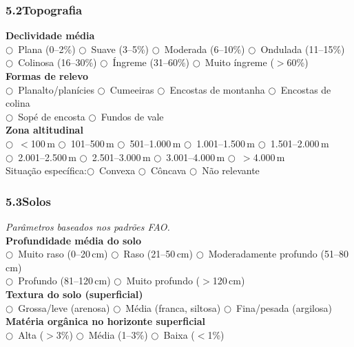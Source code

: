 \subsubsection*{5.2\quad Topografia}

\noindent\textbf{Declividade média}\\
$\bigcirc$~Plana (0--2\%) \quad $\bigcirc$~Suave (3--5\%) \quad $\bigcirc$~Moderada (6--10\%) \quad $\bigcirc$~Ondulada (11--15\%)\\
$\bigcirc$~Colinosa (16--30\%) \quad $\bigcirc$~Íngreme (31--60\%) \quad $\bigcirc$~Muito íngreme ($>$60\%)\\[4pt]
\textbf{Formas de relevo}\\
$\bigcirc$~Planalto/planícies \quad $\bigcirc$~Cumeeiras \quad $\bigcirc$~Encostas de montanha \quad $\bigcirc$~Encostas de colina\\
$\bigcirc$~Sopé de encosta \quad $\bigcirc$~Fundos de vale\\[4pt]
\textbf{Zona altitudinal}\\
$\bigcirc$~$<$100\,m \quad $\bigcirc$~101--500\,m \quad $\bigcirc$~501--1.000\,m \quad $\bigcirc$~1.001--1.500\,m \quad $\bigcirc$~1.501--2.000\,m\\
$\bigcirc$~2.001--2.500\,m \quad $\bigcirc$~2.501--3.000\,m \quad $\bigcirc$~3.001--4.000\,m \quad $\bigcirc$~$>$4.000\,m\\[4pt]
Situação específica:\quad $\bigcirc$~Convexa \quad $\bigcirc$~Côncava \quad $\bigcirc$~Não relevante

\subsubsection*{5.3\quad Solos}
\textit{Parâmetros baseados nos padrões FAO.}\\[4pt]
\textbf{Profundidade média do solo}\\
$\bigcirc$~Muito raso (0--20\,cm) \quad $\bigcirc$~Raso (21--50\,cm) \quad $\bigcirc$~Moderadamente profundo (51--80\,cm)\\
$\bigcirc$~Profundo (81--120\,cm) \quad $\bigcirc$~Muito profundo ($>$120\,cm)\\[4pt]
\textbf{Textura do solo (superficial)}\\
$\bigcirc$~Grossa/leve (arenosa) \quad $\bigcirc$~Média (franca, siltosa) \quad $\bigcirc$~Fina/pesada (argilosa)\\[4pt]
\textbf{Matéria orgânica no horizonte superficial}\\
$\bigcirc$~Alta ($>$3\%) \quad $\bigcirc$~Média (1--3\%) \quad $\bigcirc$~Baixa ($<$1\%)

